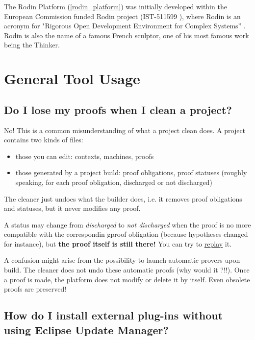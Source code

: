 The Rodin Platform (\ref{rodin_platform}) was initially developed within the European Commission funded Rodin project (IST-511599 ), where Rodin is an acronym for "Rigorous Open Development Environment for Complex Systems” . Rodin is also the name of a famous French sculptor, one of his most famous work being the Thinker. 

\section{General Tool Usage}

\subsection{Do I lose my proofs when I clean a project?}
No! This is a common misunderstanding of what a project clean does. A project contains two kinds of files: 

\begin{itemize}
	\item those you can edit: contexts, machines, proofs 
	\item those generated by a project build: proof obligations, proof statuses (roughly speaking, for each proof obligation, discharged or not discharged) 
\end{itemize}

The cleaner just undoes what the builder does, i.e. it removes proof obligations and statuses, but it never modifies any proof.

A status may change from \emph{discharged} to \emph{not discharged} when the proof is no more compatible with the correspondin gproof obligation (because hypotheses changed for instance), but \textbf{the proof itself is still there!}
You can try to \href{http://wiki.event-b.org/index.php/Proof_Obligation_Commands#Proof_Replay_on_Undischarged_POs}{replay} it.

A confusion might arise from the possibility to launch automatic provers upon build. The cleaner does not undo these automatic proofs (why would it ?!!). Once a proof is made, the platform does not modify or delete it by itself. Even \href{http://wiki.event-b.org/index.php/Proof_Purger_Interface#Why_proofs_become_obsolete}{obsolete} proofs are preserved!

\subsection{How do I install external plug-ins without using Eclipse Update Manager?}

